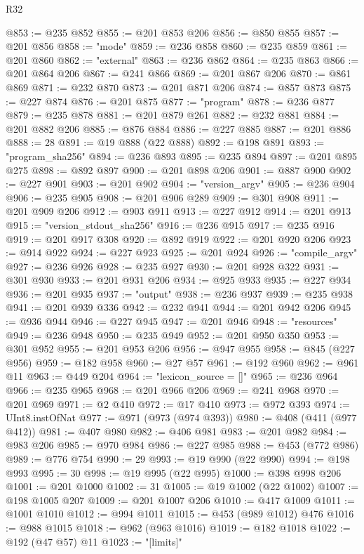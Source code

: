 \begin{lexlean}{R32}
\begin{coremodule}
@853 := @235 @852
@855 := @201 @853 @206
@856 := @850 @855
@857 := @201 @856
@858 := "mode"
@859 := @236 @858
@860 := @235 @859
@861 := @201 @860
@862 := "external"
@863 := @236 @862
@864 := @235 @863
@866 := @201 @864 @206
@867 := @241 @866
@869 := @201 @867 @206
@870 := @861 @869
@871 := @232 @870
@873 := @201 @871 @206
@874 := @857 @873
@875 := @227 @874
@876 := @201 @875
@877 := "program"
@878 := @236 @877
@879 := @235 @878
@881 := @201 @879 @261
@882 := @232 @881
@884 := @201 @882 @206
@885 := @876 @884
@886 := @227 @885
@887 := @201 @886
@888 := 28
@891 := @19 @888 (@22 @888)
@892 := @198 @891
@893 := "program_sha256"
@894 := @236 @893
@895 := @235 @894
@897 := @201 @895 @275
@898 := @892 @897
@900 := @201 @898 @206
@901 := @887 @900
@902 := @227 @901
@903 := @201 @902
@904 := "version_argv"
@905 := @236 @904
@906 := @235 @905
@908 := @201 @906 @289
@909 := @301 @908
@911 := @201 @909 @206
@912 := @903 @911
@913 := @227 @912
@914 := @201 @913
@915 := "version_stdout_sha256"
@916 := @236 @915
@917 := @235 @916
@919 := @201 @917 @308
@920 := @892 @919
@922 := @201 @920 @206
@923 := @914 @922
@924 := @227 @923
@925 := @201 @924
@926 := "compile_argv"
@927 := @236 @926
@928 := @235 @927
@930 := @201 @928 @322
@931 := @301 @930
@933 := @201 @931 @206
@934 := @925 @933
@935 := @227 @934
@936 := @201 @935
@937 := "output"
@938 := @236 @937
@939 := @235 @938
@941 := @201 @939 @336
@942 := @232 @941
@944 := @201 @942 @206
@945 := @936 @944
@946 := @227 @945
@947 := @201 @946
@948 := "resources"
@949 := @236 @948
@950 := @235 @949
@952 := @201 @950 @350
@953 := @301 @952
@955 := @201 @953 @206
@956 := @947 @955
@958 := @845 (@227 @956)
@959 := @182 @958
@960 := @27 @57
@961 := @192 @960
@962 := @961 @11
@963 := @449 @204
@964 := "lexicon_source = []"
@965 := @236 @964
@966 := @235 @965
@968 := @201 @966 @206
@969 := @241 @968
@970 := @201 @969
@971 := @2 @410
@972 := @17 @410
@973 := @972 @393
@974 := UInt8.instOfNat
@977 := @971 (@973 (@974 @393))
@980 := @408 (@411 (@977 @412))
@981 := @407 @980
@982 := @406 @981
@983 := @201 @982
@984 := @983 @206
@985 := @970 @984
@986 := @227 @985
@988 := @453 (@772 @986)
@989 := @776 @754
@990 := 29
@993 := @19 @990 (@22 @990)
@994 := @198 @993
@995 := 30
@998 := @19 @995 (@22 @995)
@1000 := @398 @998 @206
@1001 := @201 @1000
@1002 := 31
@1005 := @19 @1002 (@22 @1002)
@1007 := @198 @1005 @207
@1009 := @201 @1007 @206
@1010 := @417 @1009
@1011 := @1001 @1010
@1012 := @994 @1011
@1015 := @453 (@989 @1012) @476
@1016 := @988 @1015
@1018 := @962 (@963 @1016)
@1019 := @182 @1018
@1022 := @192 (@47 @57) @11
@1023 := "[limits]"

\end{coremodule}
\end{lexlean}
